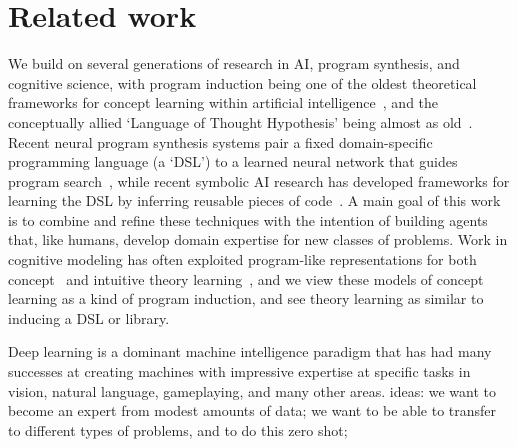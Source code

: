 \documentclass{article}
\begin{document}
\section{Related work}

We build on several generations of research in AI, program synthesis,
and cognitive science, with program induction being one of the oldest
theoretical frameworks for concept learning within artificial
intelligence~\cite{solomonoff1964formal}, and the conceptually allied
`Language of Thought Hypothesis' being almost as
old~\cite{fodor1975language}. Recent neural program synthesis systems
pair a fixed domain-specific programming language (a `DSL') to a
learned neural network that guides program
search~\cite{spiral,balog2016deepcoder,devlin2017neural}, while recent
symbolic AI research has developed frameworks for learning the DSL by
inferring reusable pieces of
code~\cite{ecc,Dechter:2013:BLV:2540128.2540316,DBLP:conf/icml/LiangJK10,DBLP:conf/ecai/LinDETM14}.
A main goal of this work is to combine and refine these techniques
with the intention of building agents that, like humans, develop
domain expertise for new classes of problems.  Work in cognitive
modeling has often exploited program-like representations for both
concept~\cite{piantadosi2011learning,lake2015human,GoodmanEtAl2015-Chapter} and intuitive theory
learning~\cite{logical,Ullman2012},
and we view these models of concept learning as
a kind of program induction,
and see theory learning as similar to inducing a DSL or library.

Deep learning is a dominant machine intelligence paradigm that
has had many successes
at creating machines with impressive expertise at
specific tasks in vision, natural language, gameplaying, and many other areas. ideas: we want to become an expert from modest amounts of data; we want to be able to transfer to different types of problems, and to do this zero shot; 
\end{document}
